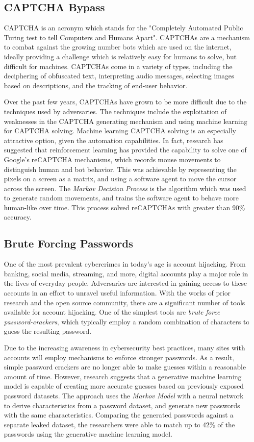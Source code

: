\documentclass[11pt,conference]{IEEEtran}
\begin{document}
\subsection{CAPTCHA Bypass}
CAPTCHA is an acronym which stands for the "Completely Automated Public Turing test
to tell Computers and Humans Apart". CAPTCHAs are a 
mechanism to combat against the growing number bots which are used on the
internet, ideally providing a challenge which is relatively easy for humans to
solve, but difficult for machines. CAPTCHAs come in a variety of types,
including the deciphering of obfuscated text, interpreting audio messages,
selecting images based on descriptions, and the tracking of end-user behavior.

Over the past few years, CAPTCHAs have grown to be more difficult due to the
techniques used by adversaries. The techniques include the exploitation of
weaknesses in the CAPTCHA generating mechanism
and using machine learning for CAPTCHA solving. Machine learning
CAPTCHA solving is an especially attractive option, given the automation
capabilities. In fact, research has suggested that reinforcement learning has
provided the capability to solve one of Google's reCAPTCHA mechanisms, which
records mouse movements to distinguish human and bot behavior. This was
achievable by representing the pixels on a screen as a matrix, and using a
software agent to move the
cursor across the screen. The \emph{Markov
Decision Process} is the algorithm which was used to generate random movements,
and trains the software agent to behave more human-like over time. This
process solved reCAPTCHAs with greater than 90\% accuracy.

\subsection{Brute Forcing Passwords}
One of the most prevalent cybercrimes in today's age is account hijacking. From
banking, social media, streaming, and more, digital accounts play a major role
in the lives of everyday people. Adversaries are interested in
gaining access to these accounts in an effort to unravel useful information.
With the works of prior research and the open source community, there are a
significant number of tools available for account hijacking. One of the
simplest tools are \emph{brute force password-crackers}, which typically employ a random
combination of characters to guess the resulting password.

Due to the increasing awareness in cybersecurity best practices, many sites
with accounts will employ mechanisms to enforce stronger passwords. As a
result, simple password crackers are no longer able to make guesses 
within a reasonable amount of time. However, research suggests that a
generative machine learning model is capable of creating more accurate guesses
based on previously exposed password datasets. The approach uses the
\emph{Markov Model} with a neural network to derive characteristics from a
password dataset, and generate new passwords with the same characteristics.
Comparing the generated passwords against a separate leaked dataset, the
researchers were able to match up to 42\% of the passwords using the generative
machine learning model.
\end{document}

